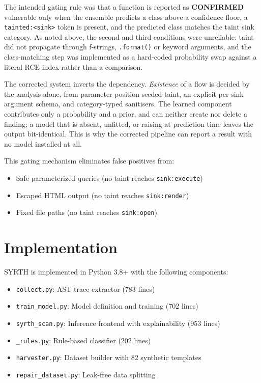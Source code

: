 \documentclass[12pt,a4paper]{article}
\begin{document}
The intended gating rule was that a function is reported as \textbf{CONFIRMED}
vulnerable only when the ensemble predicts a class above a confidence floor, a
\texttt{tainted:<sink>} token is present, and the predicted class matches the
taint sink category. As noted above, the second and third conditions were
unreliable: taint did not propagate through f-strings, \texttt{.format()} or
keyword arguments, and the class-matching step was implemented as a hard-coded
probability swap against a literal RCE index rather than a comparison.

The corrected system inverts the dependency. \emph{Existence} of a flow is decided
by the analysis alone, from parameter-position-seeded taint, an explicit per-sink
argument schema, and category-typed sanitisers. The learned component contributes
only a probability and a prior, and can neither create nor delete a finding; a
model that is absent, unfitted, or raising at prediction time leaves the output
bit-identical. This is why the corrected pipeline can report a result with no
model installed at all.

This gating mechanism eliminates false positives from:
\begin{itemize}
    \item Safe parameterized queries (no taint reaches \texttt{sink:execute})
    \item Escaped HTML output (no taint reaches \texttt{sink:render})
    \item Fixed file paths (no taint reaches \texttt{sink:open})
\end{itemize}

\section{Implementation}
\label{sec:implementation}

SYRTH is implemented in Python 3.8+ with the following components:

\begin{itemize}
    \item \texttt{collect.py}: AST trace extractor (783 lines)
    \item \texttt{train\_model.py}: Model definition and training (702 lines)
    \item \texttt{syrth\_scan.py}: Inference frontend with explainability (953 lines)
    \item \texttt{\_rules.py}: Rule-based classifier (202 lines)
    \item \texttt{harvester.py}: Dataset builder with 82 synthetic templates
    \item \texttt{repair\_dataset.py}: Leak-free data splitting
\end{itemize}
\end{document}
